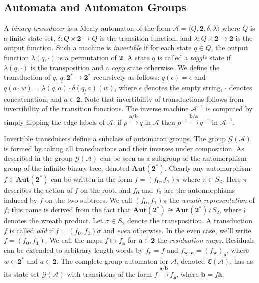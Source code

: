 \documentclass[12pt, letterpaper]{article}
\newcommand{\bin}{\mathbf 2}
\newcommand{\A}{\mathcal A}
\newcommand{\ch}[1]{\mathbf{#1}}
\newcommand{\res}[2]{{{#1}_{\ch{#2}}}}
\newcommand{\comp}{\mathfrak C}
\newcommand{\Aut}{\mathbf{Aut}}
\newcommand{\gp}{\mathcal G}
\begin{document}
\subsection{Automata and Automaton Groups}
A \emph{binary transducer} is a Mealy automaton of the form $\A = \langle Q,
\bin, \delta, \lambda \rangle$ where $Q$ is a finite state set, $\delta: Q
\times \bin \rightarrow Q$ is the transition function, and $\lambda: Q \times
\bin \rightarrow \bin$ is the output function. Such a machine is
\emph{invertible} if for each state $q \in Q$, the output function $\lambda(q,
\cdot)$ is a permutation of $\bin$. A state $q$ is called a \emph{toggle} state
if $\lambda(q, \cdot)$ is the transposition and a \emph{copy} state otherwise.
We define the transduction of $q$, $\underline{q}: \bin^* \rightarrow \bin^*$
recursively as follows: $\underline{q}(\epsilon) = \epsilon$ and
$\underline{q}(a \cdot w) = \lambda(q, a) \cdot \underline{\delta(q, a)}(w)$,
where $\epsilon$ denotes the empty string, $\cdot$ denotes concatenation, and
$a \in \bin$. Note that invertibility of transductions follows from
invertibility of the transition functions.  The inverse machine $\A^{-1}$ is
computed by simply flipping the edge labels of $\A$: if
$p \xrightarrow{\ch{a} / \ch{b}} q$ in $\A$ then
$p^{-1} \xrightarrow{\ch{b} / \ch{a}} q^{-1}$ in $\A^{-1}$.

Invertible transducers define a subclass of automaton groups. The group
$\gp(\A)$ is formed by taking all transductions and their inverses under
composition.  As described in \cite{jalc170214} the group $\gp(\A)$ can be seen
as a subgroup of the automorphism group of the infinite binary tree, denoted
$\Aut(\bin^*)$.  Clearly any automorphism $f \in \Aut(\bin^*)$ can be written
in the form $f = (\res{f}{0}, \res{f}{1})\pi$ where $\pi \in S_2$. Here $\pi$
describes the action of $f$ on the root, and $\res{f}{0}$ and $\res{f}{1}$ are
the automorphisms induced by $f$ on the two subtrees. We call $(\res{f}{0},
\res{f}{1})\pi$ the \emph{wreath representation} of $f$; this name is derived
from the fact that $\Aut(\bin^*) \cong \Aut(\bin^*) \, \wr \, S_2$, where $\wr$
denotes the wreath product. Let $\sigma \in S_2$ denote the transposition. A
transduction $f$ is called \emph{odd} if $f = (\res{f}{0}, \res{f}{1}) \sigma$
and \emph{even} otherwise. In the even case, we'll write $f = (\res{f}{0},
\res{f}{1})$. We call the maps $f \mapsto \res{f}{a}$ for $\ch{a} \in \bin$ the
\emph{residuation maps}. Residuals can be extended to arbitrary length words by
$\res{f}{\epsilon} = f$ and $\res{f}{w \cdot a} = \res{(\res{f}{w})}{a}$, where
$w \in \bin^*$ and $a \in \bin$. The complete group automaton for $\A$, denoted
$\comp(\A)$, has as its state set $\gp(\A)$ with transitions of the form $f
\xrightarrow{\ch{a} / \ch{b}} \res{f}{a}$, where $\ch{b} = f \ch{a}$.
\end{document}
